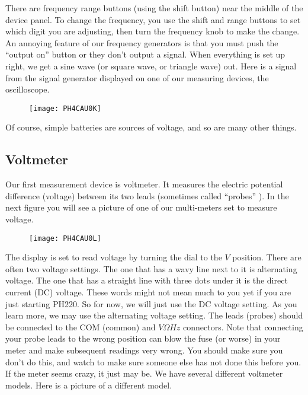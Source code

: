 There are frequency range buttons (using the shift button) near the middle of the device panel. To change the frequency, you use the shift and range buttons to set which digit you are adjusting, then turn the frequency knob to make the change. An annoying feature of our frequency generators is that you must push the ``output on'' button or they don't output a signal. When everything is set up right, we get a sine wave (or square wave, or triangle wave) out. Here is a signal from the signal generator displayed on one of our measuring devices, the
oscilloscope. 

\begin{figure}[h!]
    \centering
    \texttt{[image: PH4CAU0K]}
\end{figure}

Of course, simple batteries are sources of voltage, and so are many other things.

\subsection{Voltmeter}

Our first measurement device is voltmeter. It measures the electric potential difference (voltage) between its two leads (sometimes called ``probes'' ). In the next figure you will see a picture of one of our multi-meters set to measure voltage.

\begin{figure}[h!]
	\centering
	\texttt{[image: PH4CAU0L]}
\end{figure}

The display is set to read voltage by turning the dial to the $\unit{V}$ position. There are often two voltage settings. The one that has a wavy line next to it is alternating voltage. The one that has a straight line with three dots under it is the direct current (DC) voltage. These words might not mean much to you yet if you are just starting PH220. So for now, we will just use the DC voltage setting. As you learn more, we may use the alternating voltage setting. The leads (probes) should be connected to the COM (common) and $\unit{V}\unit{\Omega}\unit{Hz}$ connectors. Note that connecting your probe leads to the wrong position can blow the fuse (or worse) in your meter and make subsequent readings very wrong. You should make sure you don't do this, and watch to make sure someone else has not done this before you. If the meter seems crazy, it just may be. We have several different voltmeter models. Here is a picture of a different model.

